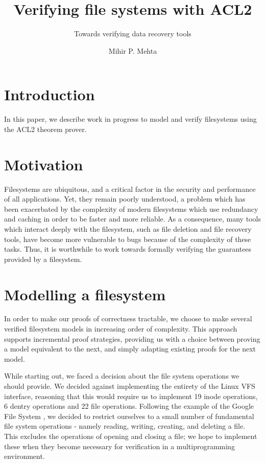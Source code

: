 \documentclass[format=sigconf,review=true]{acmart}
\title{Verifying file systems with ACL2}
\subtitle{Towards verifying data recovery tools}
\author{Mihir P. Mehta}
\affiliation{%
  \institution{University of Texas at Austin}
  \city{Austin}
  \state{TX}
  \country{USA}}
\begin{document}
\lstset{language=Lisp}

\maketitle

\section{Introduction}

In this paper, we describe work in progress to model and verify
filesystems using the ACL2 theorem prover.

\section{Motivation}
Filesystems are ubiquitous, and a critical factor in the security and
performance of all applications. Yet, they remain poorly understood,
a problem which has been exacerbated by the complexity of modern
filesystems which use redundancy and caching in order to be faster and
more reliable. As a consequence, many tools which interact deeply with
the filesystem, such as file deletion and file recovery tools, have
become more vulnerable to bugs because of the complexity of these
tasks. Thus, it is worthwhile to work towards formally verifying the
guarantees provided by a filesystem.

\section{Modelling a filesystem}

In order to make our proofs of correctness tractable, we choose to
make several verified filesystem models in increasing order of
complexity. This approach supports incremental proof strategies,
providing us with a choice between proving a model equivalent to the
next, and simply adapting existing proofs for the next model.

While starting out, we faced a decision about the file system
operations we should provide. We decided against implementing the
entirety of the Linux VFS interface\cite{johnson_1996}, reasoning that this would require
us to implement 19 inode operations, 6 dentry operations and 22 file
operations. Following the  example of the Google File System
\cite{ghemawat2003google}, we decided to restrict ourselves to a small
number of fundamental file system operations - namely reading, writing,
creating, and deleting a file. This excludes the operations of opening
and closing a file; we hope to implement these when they become
necessary for verification in a multiprogramming environment.
\end{document}
